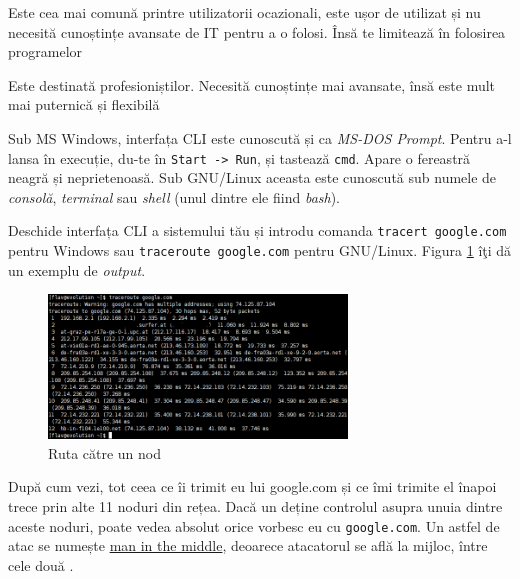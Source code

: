 \begin{itemize}
	\begin{item} 
	\end{item}
	
	\begin{item}
	\end{item}
\end{itemize}
Sub MS Windows, interfața CLI este cunoscută și ca \textsl{MS-DOS Prompt}. Pentru
a-l lansa în execuție, du-te în \texttt{Start -> Run}, și tastează \texttt{cmd}.
Apare o fereastră neagră și neprietenoasă. Sub GNU/Linux aceasta este
cunoscută sub numele de \textsl{consolă}, \textsl{terminal} sau
\textsl{shell} (unul dintre ele fiind \textsl{bash}).

Deschide interfața CLI a sistemului tău și introdu comanda
\texttt{tracert google.com} pentru Windows sau \texttt{traceroute google.com} pentru 
GNU/Linux. Figura \ref{fig:cli traceroute} îţi dă un exemplu de \textsl{output}.

\begin{figure}[h!]
  \centering
    \includegraphics[width=300px]{cap01/traceroute.png}
  \caption{Ruta către un nod}
  \label{fig:cli traceroute}
\end{figure}

După cum vezi, tot ceea ce îi trimit eu lui google.com și ce îmi trimite
el înapoi trece prin alte 11 noduri din rețea. Dacă un 
deține controlul asupra unuia dintre aceste noduri,
poate vedea absolut orice {\glqq}vorbesc{\grqq} eu cu \texttt{google.com}. Un astfel de atac
se numește \href{http://en.wikipedia.org/wiki/Man-in-the-middle_attack}{man in the middle},
deoarece atacatorul se află la mijloc, între
cele două .

